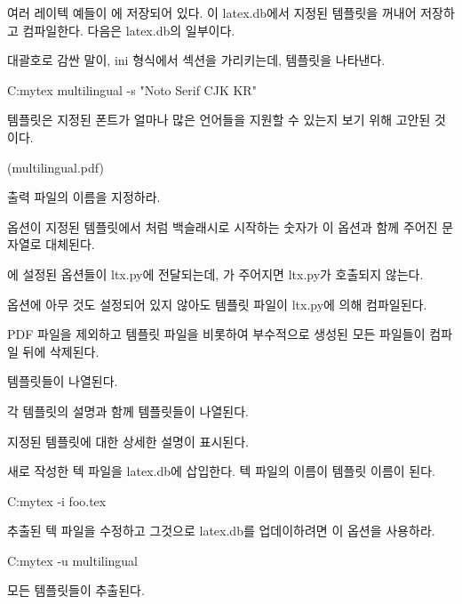 여러 레이텍 예들이 에 저장되어 있다.
이 latex.db에서 지정된 템플릿을 꺼내어 저장하고 컴파일한다.
다음은 latex.db의 일부이다.

\coderead[language=ini] 

대괄호로 감싼 말이, ini 형식에서 섹션을 가리키는데, 템플릿을 나타낸다.

\begin{code}
C:\>mytex multilingual -s "Noto Serif CJK KR"
\end{code}

 템플릿은 지정된 폰트가 얼마나 많은 언어들을 지원할 수 있는지 보기 위해 고안된 것이다.

(multilingual.pdf)

\begin{macros}
\item[-o] 출력 파일의 이름을 지정하라.
\item[-s]  옵션이 지정된 템플릿에서 \macro*{\1}처럼 백슬래시로 시작하는 숫자가 이 옵션과 함께 주어진 문자열로 대체된다.
\item[-n] 에 설정된 옵션들이 ltx.py에 전달되는데, 가 주어지면 ltx.py가 호출되지 않는다.
\item[-f]  옵션에 아무 것도 설정되어 있지 않아도 템플릿 파일이 ltx.py에 의해 컴파일된다.
\item[-r] PDF 파일을 제외하고 템플릿 파일을 비롯하여 부수적으로 생성된 모든 파일들이 컴파일 뒤에 삭제된다.
\item[-l] 템플릿들이 나열된다.
\item[-L] 각 템플릿의 설명과 함께 템플릿들이 나열된다.
\item[-d] 지정된 템플릿에 대한 상세한 설명이 표시된다.
\item[-i] 새로 작성한 텍 파일을 latex.db에 삽입한다. 텍 파일의 이름이 템플릿 이름이 된다.
\begin{code}
C:\>mytex -i foo.tex
\end{code}

\item[-u] 추출된 텍 파일을 수정하고 그것으로 latex.db를 업데이하려면 이 옵션을 사용하라.
\begin{code}
C:\>mytex -u multilingual
\end{code}

\item[-b] 모든 템플릿들이 추출된다.
\end{macros}


